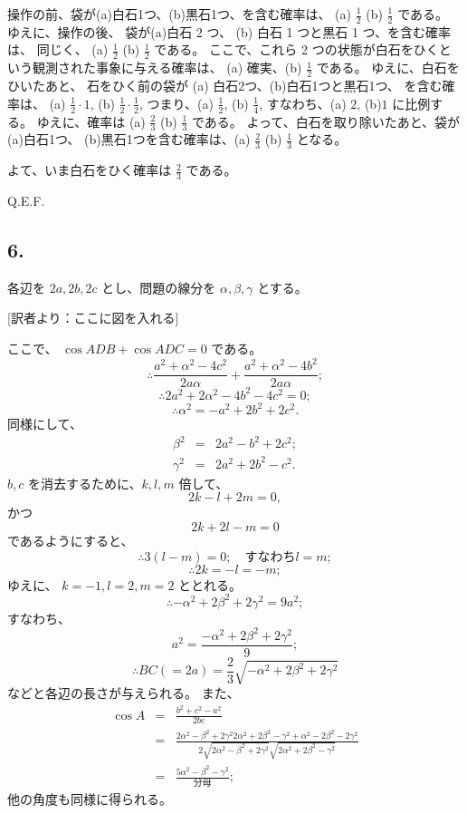 操作の前、袋が(a)白石1つ、(b)黒石1つ、を含む確率は、
(a) $\frac{1}{2}$ (b) $\frac{1}{2}$ である。
ゆえに、操作の後、
袋が(a)白石 2 つ、 (b) 白石 1 つと黒石 1 つ、を含む確率は、
同じく、
(a) $\frac{1}{2}$ (b) $\frac{1}{2}$ である。
ここで、これら 2 つの状態が白石をひくという観測された事象に与える確率は、
(a) 確実、(b) $\frac{1}{2}$ である。
ゆえに、白石をひいたあと、
石をひく前の袋が (a) 白石2つ、(b)白石1つと黒石1つ、
を含む確率は、
(a) $\frac{1}{2} \cdot 1$, (b) $\frac{1}{2}\cdot \frac{1}{2}$,
つまり、(a) $\frac{1}{2}$, (b) $\frac{1}{4}$,
すなわち、(a) $2$, (b)$1$ に比例する。
ゆえに、確率は (a) $\frac{2}{3}$ (b) $\frac{1}{3}$ である。
よって、白石を取り除いたあと、袋が(a)白石1つ、
(b)黒石1つを含む確率は、(a) $\frac{2}{3}$ (b) $\frac{1}{3}$
となる。

よて、いま白石をひく確率は $\frac{2}{3}$ である。

Q.E.F.

\subsection*{6.}

各辺を $2a, 2b, 2c$ とし、問題の線分を $\alpha, \beta, \gamma$
とする。

[訳者より：ここに図を入れる]

ここで、
$\cos ADB + \cos ADC = 0$ である。
\[
\therefore
\frac{a^2 + \alpha^2 - 4c^2}{2a \alpha} 
+ \frac{a^2 + \alpha^2 - 4b^2}{2a \alpha};
\]
\[
\therefore
2 a^2 + 2\alpha^2 - 4b^2 - 4c^2 = 0;
\]
\[
\therefore
\alpha^2 = - a^2 + 2b^2 + 2c^2.
\]
同様にして、
\begin{eqnarray*}
\beta^2 &=& 2 a^2 - b^2 + 2c^2;\\
\gamma^2 &=& 2 a^2 + 2b^2 - c^2.
\end{eqnarray*}
$b,c $ を消去するために、$k, l, m$ 倍して、
\[
2k -l + 2m = 0,
\]
かつ
\[
2k + 2l - m = 0
\]
であるようにすると、
\[
\therefore
3 (l-m) = 0;
\quad \mbox{すなわち}
l = m;
\]
\[
\therefore
2k = -l = -m;
\]
ゆえに、 $k = -1, l = 2, m = 2$ ととれる。
\[
\therefore
- \alpha^2 + 2 \beta^2 + 2 \gamma^2 = 9 a^2;
\]
すなわち、
\[
a^2 = \frac{- \alpha^2 + 2 \beta^2 + 2 \gamma^2}{9};
\]
\[
\therefore
BC (= 2a) = \frac{2}{3} \sqrt{- \alpha^2 + 2 \beta^2 + 2 \gamma^2}
\]
などと各辺の長さが与えられる。
また、
\begin{eqnarray*}
\cos A &=& \frac{b^2 + c^2 - a^2}{2bc}\\
 &=& \frac{2\alpha^2 - \beta^2 + 2\gamma^2
2\alpha^2 + 2\beta^2 - \gamma^2 + \alpha^2 - 2\beta^2 - 2\gamma^2}
{2 \sqrt{2\alpha^2 - \beta^2 + 2\gamma^2}
\sqrt{2\alpha^2 + 2\beta^2 - \gamma^2}}\\
&=&
\frac{5 \alpha^2 - \beta^2 - \gamma^2}{\mbox{分母}};
\end{eqnarray*}
他の角度も同様に得られる。

